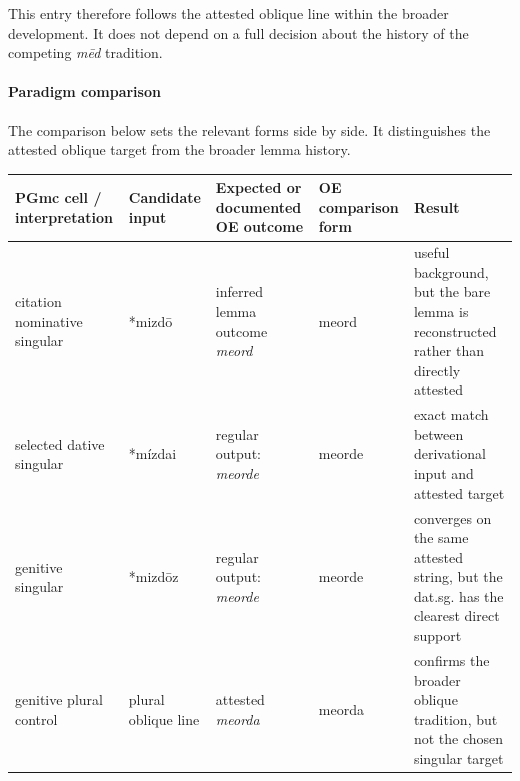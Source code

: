 \documentclass[
  british,
  a4paper,
]{article}
\newcounter{none} %
\begin{document}
This entry therefore follows the attested oblique line within the
broader development. It does not depend on a full decision about the
history of the competing \emph{mēd} tradition.

\paragraph{Paradigm comparison}\label{paradigm-comparison-11}

The comparison below sets the relevant forms side by side. It
distinguishes the attested oblique target from the broader lemma
history.

{\def\LTcaptype{none} %
\begin{longtable}[]{@{}
  >{\raggedright\arraybackslash}p{}
  >{\raggedright\arraybackslash}p{}
  >{\raggedright\arraybackslash}p{}
  >{\raggedright\arraybackslash}p{}
  >{\raggedright\arraybackslash}p{}@{}}
\toprule\noalign{}
\begin{minipage}[b]{\linewidth}\raggedright
PGmc cell / interpretation
\end{minipage} & \begin{minipage}[b]{\linewidth}\raggedright
Candidate input
\end{minipage} & \begin{minipage}[b]{\linewidth}\raggedright
Expected or documented OE outcome
\end{minipage} & \begin{minipage}[b]{\linewidth}\raggedright
OE comparison form
\end{minipage} & \begin{minipage}[b]{\linewidth}\raggedright
Result
\end{minipage} \\
\midrule\noalign{}
\endhead
\bottomrule\noalign{}
\endlastfoot
citation nominative singular & *mizdō & inferred lemma outcome
\emph{meord} & meord & useful background, but the bare lemma is
reconstructed rather than directly attested \\
selected dative singular & *mízdai & regular output: \emph{meorde} &
meorde & exact match between derivational input and attested target \\
genitive singular & *mizdōz & regular output: \emph{meorde} & meorde &
converges on the same attested string, but the dat.sg. has the clearest
direct support \\
genitive plural control & plural oblique line & attested \emph{meorda} &
meorda & confirms the broader oblique tradition, but not the chosen
singular target \\
\end{longtable}
}
\end{document}
